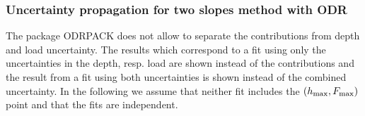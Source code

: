  
 \subsubsection{Uncertainty propagation for two slopes method with ODR} \label{slopes_unc}
The package ODRPACK does not allow to separate the contributions from depth and load uncertainty. 
The results which correspond to a fit using only the uncertainties in the depth, resp. load are shown instead of the contributions and 
the result from a fit using both uncertainties is shown instead of the combined uncertainty.
In the following we assume that neither fit includes the $(h_\mathrm{max}, F_\mathrm{max})$ point and that the fits are independent.

